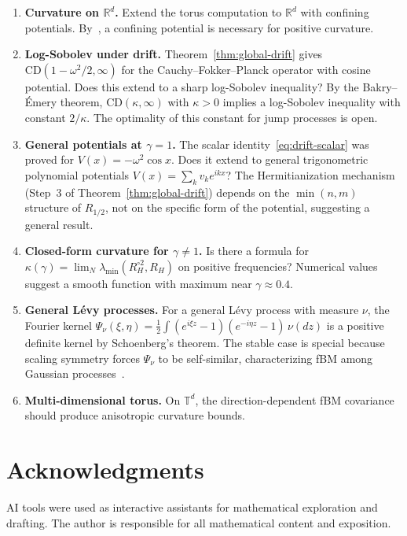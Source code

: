 \documentclass[11pt,a4paper]{article}
\theoremstyle{plain}
\theoremstyle{definition}
\theoremstyle{remark}
\newcommand{\R}{\mathbb{R}}
\newcommand{\T}{\mathbb{T}}
\begin{document}
\begin{enumerate}[label=(\roman*)]
\item \textbf{Curvature on $\R^d$.}
  Extend the torus computation to $\R^d$ with confining potentials.
  By~\cite{SpenerWeberZacher2020}, a confining potential is necessary
  for positive curvature.

\item \textbf{Log-Sobolev under drift.}
  Theorem~\ref{thm:global-drift} gives $\mathrm{CD}(1-\omega^2/2,\infty)$
  for the Cauchy--Fokker--Planck operator with cosine potential.
  Does this extend to a sharp log-Sobolev inequality?
  By the Bakry--\'Emery theorem, $\mathrm{CD}(\kappa,\infty)$ with
  $\kappa > 0$ implies a log-Sobolev inequality with constant $2/\kappa$.
  The optimality of this constant for jump processes is open.

\item \textbf{General potentials at $\gamma = 1$.}
  The scalar identity~\eqref{eq:drift-scalar} was proved for
  $V(x) = -\omega^2\cos x$.  Does it extend to general trigonometric
  polynomial potentials $V(x) = \sum_k v_k e^{ikx}$?
  The Hermitianization mechanism (Step~3 of Theorem~\ref{thm:global-drift})
  depends on the $\min(n,m)$ structure of $R_{1/2}$, not on the
  specific form of the potential, suggesting a general result.

\item \textbf{Closed-form curvature for $\gamma \neq 1$.}
  Is there a formula for
  $\kappa(\gamma) = \lim_N \lambda_{\min}(R_H^{\circ 2}, R_H)$
  on positive frequencies? Numerical values suggest a smooth
  function with maximum near $\gamma \approx 0.4$.

\item \textbf{General L\'evy processes.}
  For a general L\'evy process with measure $\nu$, the
  Fourier kernel
  $\Psi_\nu(\xi,\eta) = \frac{1}{2}\int (e^{i\xi z}-1)(e^{-i\eta z}-1)\,
  \nu(dz)$ is a positive definite kernel by Schoenberg's theorem.
  The stable case is special because scaling symmetry forces
  $\Psi_\nu$ to be self-similar, characterizing fBM among Gaussian
  processes~\cite{Mishura2008}.

\item \textbf{Multi-dimensional torus.}
  On $\T^d$, the direction-dependent fBM covariance should produce
  anisotropic curvature bounds.
\end{enumerate}


\section*{Acknowledgments}
AI tools were used as interactive assistants for mathematical
exploration and drafting. The author
is responsible for all mathematical content and exposition.
\end{document}
